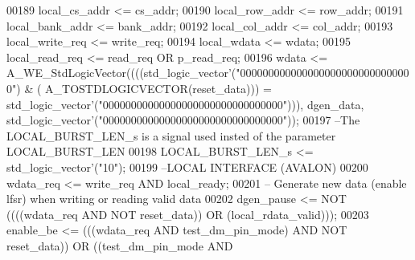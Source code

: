\begin{DoxyCode}
00189   local\_cs\_addr <= cs\_addr;
00190   local\_row\_addr <= row\_addr;
00191   local\_bank\_addr <= bank\_addr;
00192   local\_col\_addr <= col\_addr;
00193   local\_write\_req <= write\_req;
00194   local\_wdata <= wdata;
00195   local\_read\_req <= read\_req \textcolor{keywordflow}{OR} p\_read\_req;
00196   \textcolor{vhdlchar}{wdata} \textcolor{vhdlchar}{<=} \textcolor{vhdlchar}{A\_WE\_StdLogicVector}\textcolor{vhdlchar}{(}\textcolor{vhdlchar}{(}\textcolor{vhdlchar}{(}\textcolor{vhdlchar}{(}\textcolor{comment}{std\_logic\_vector}\textcolor{vhdlchar}{'}\textcolor{vhdlchar}{(}\textcolor{vhdllogic}{"0000000000000000000000000000000"}\textcolor{vhdlchar}{)} \textcolor{vhdlchar}{&} \textcolor{vhdlchar}{(}\textcolor{vhdlchar}{
      A\_TOSTDLOGICVECTOR}\textcolor{vhdlchar}{(}\textcolor{vhdlchar}{reset_data}\textcolor{vhdlchar}{)}\textcolor{vhdlchar}{)}\textcolor{vhdlchar}{)} \textcolor{vhdlchar}{=} \textcolor{comment}{std\_logic\_vector}\textcolor{vhdlchar}{'}\textcolor{vhdlchar}{(}\textcolor{vhdllogic}{"00000000000000000000000000000000"}\textcolor{vhdlchar}{)}\textcolor{vhdlchar}{)}\textcolor{vhdlchar}{)}\textcolor{vhdlchar}{,} \textcolor{vhdlchar}{
      dgen_data}\textcolor{vhdlchar}{,} \textcolor{comment}{std\_logic\_vector}\textcolor{vhdlchar}{'}\textcolor{vhdlchar}{(}\textcolor{vhdllogic}{"00000000000000000000000000000000"}\textcolor{vhdlchar}{)}\textcolor{vhdlchar}{)};
00197 \textcolor{keyword}{  --The LOCAL\_BURST\_LEN\_s is a signal used insted of the parameter LOCAL\_BURST\_LEN}
00198   LOCAL\_BURST\_LEN\_s <= std\_logic\_vector'("\textcolor{vhdllogic}{10}");
00199 \textcolor{keyword}{  --LOCAL INTERFACE (AVALON)}
00200   \textcolor{vhdlchar}{wdata_req} \textcolor{vhdlchar}{<=} \textcolor{vhdlchar}{write_req} \textcolor{keywordflow}{AND} \textcolor{vhdlchar}{local_ready};
00201 \textcolor{keyword}{  -- Generate new data (enable lfsr) when writing or reading valid data}
00202   \textcolor{vhdlchar}{dgen_pause} \textcolor{vhdlchar}{<=} \textcolor{keywordflow}{NOT} \textcolor{vhdlchar}{(}\textcolor{vhdlchar}{(}\textcolor{vhdlchar}{(}\textcolor{vhdlchar}{(}\textcolor{vhdlchar}{wdata_req} \textcolor{keywordflow}{AND} \textcolor{keywordflow}{NOT} \textcolor{vhdlchar}{reset_data}\textcolor{vhdlchar}{)}\textcolor{vhdlchar}{)} \textcolor{keywordflow}{OR} \textcolor{vhdlchar}{(}\textcolor{vhdlchar}{local_rdata_valid}\textcolor{vhdlchar}{)}\textcolor{vhdlchar}{)}\textcolor{vhdlchar}{)};
00203   enable\_be <= (((wdata\_req \textcolor{keywordflow}{AND} test\_dm\_pin\_mode) \textcolor{keywordflow}{AND} \textcolor{keywordflow}{NOT} reset\_data)) \textcolor{keywordflow}{OR} ((test\_dm\_pin\_mode \textcolor{keywordflow}{AND} 

\end{DoxyCode}

